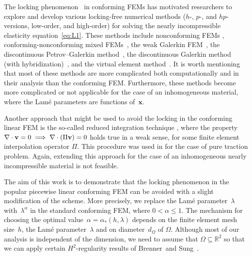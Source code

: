 \documentclass[11pt]{article}
\newcommand{\vv}{{\bf v}}
\newcommand{\bsx}{{\boldsymbol{x}}}
\numberwithin{equation}{section}
\begin{document}
The locking phenomenon~\cite{AinsworthParker2022} in conforming FEMs has motivated researchers to explore 
and develop various  locking-free numerical methods ($h$-, $p$-, and $hp$-versions, low-order, and 
high-order) for solving the nearly incompressible elasticity equation~\eqref{eq:L1}. These methods include  nonconforming FEMs \cite{ArnoldAwanouWinther2014,BrennerSung1992,ChenRenMao2010,Falk1991,
LeeLeeSheen2003,MaoChen2008,YangChen2010}, conforming-nonconforming mixed FEMs~\cite{BoffiBrezziFortin2013, 
GopalakrishnanGuzmán2011,HuShi2008,ZhangZhaoChenYang2018}, the weak Galerkin FEM~\cite{ChenXie2016,
HuoWangWangZhang2020,HuoWangWangZhang2023,LiuWang2022,WangWangWangZhang2016}, the discontinuous 
Petrov--Galerkin method~\cite{BramwellDemkowiczGopalakrishnanQiu2012}, the discontinuous Galerkin method 
(with hybridization)~\cite{CockburnSchotzauWang2006,DiPietroNicaise2013,HansboLarson2002,
SoonCockburnStolarski2009,Wihler2006}, and the virtual element  method~\cite{EdoardoStefanoCarloLuca2020,HuangLinYu2022,VeigaBrezziMarini2013,ZhangZhaoYangChen2019,
ZhaoWangZhang2022}.  It is worth mentioning that most of these methods are more complicated both 
computationally and in their analysis than the conforming FEM. Furthermore, these methods become more  complicated or not applicable for the case of an inhomogeneous material, where the Lam\'e parameters are functions of~$\bsx$.

{\color{red}  Another approach that might be used to avoid the locking in the conforming linear FEM is the so-called reduced integration technique \cite{HughesCohenHaroun1978,MalkusHughes1978}, where the property $\nabla \cdot \vv =0 \implies \nabla \cdot (\Pi \vv)=0$ holds true  in a weak sense, for some  finite element interpolation operator $\Pi$.   This procedure  was used in \cite{BrennerSung1992} for the case of   pure traction problem. Again, extending this approach for the case of an inhomogeneous nearly incompressible material is not feasible.}

The aim of this work is to demonstrate that the locking phenomenon in the  popular piecewise linear conforming FEM can be avoided with a slight modification of the scheme. More precisely, we replace the Lam\'e parameter~$\lambda$ with~$\lambda^\alpha$ in the standard conforming FEM, where $0 < \alpha \leq 1$. The  mechanism for choosing the optimal value~$\alpha=\alpha_*(h,\lambda)$ depends on the finite element mesh  size~$h$, the Lam\'e parameter~$\lambda$ and on  diameter~$d_\Omega$ of $\Omega$.  Although most of our analysis is independent of the dimension, we need to assume that $\Omega\subseteq\mathbb{R}^2$ so that we can apply certain $H^2$-regularity results
of Brenner~and Sung~\cite{BrennerSung1992}.
\end{document}
